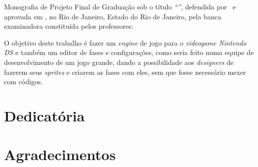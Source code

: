 \documentclass[brazil]{abnt}
\begin{document}

\capa
\folhaderosto

\begin{folhadeaprovacao}
Monografia de Projeto Final de Graduação sob o título \textit{``\ABNTtitulodata''},
defendida por \ABNTautordata~e aprovada em \ABNTdatadata, no Rio de Janeiro,
Estado do Rio de Janeiro, pela banca examinadora constituída pelos
professores: \setlength{\ABNTsignthickness}{0.4pt}

  
\end{folhadeaprovacao}

\begin{resumo}
O objetivo deste trabalho é fazer um \textit{engine} de jogo para o \textit{videogame Nintendo DS\texttrademark} e também um editor de fases 
e configurações, como seria feito numa equipe de desenvolvimento de um jogo grande, dando a possibilidade aos \textit{designers} 
de fazerem seus \textit{sprites} e criarem as fases com eles, sem que fosse necessário mexer com códigos.
\end{resumo}

\begin{abstract}
The objective of this paper is to make a game engine to the Nintendo DS\texttrademark system and a level and configurations editor, as it
would be done in a development team in a big game, giving designers the possibility to make their sprites and create their levels 
without touching actual source code.
\end{abstract}

\chapter*{Dedicatória}

\chapter*{Agradecimentos}
\end{document}
